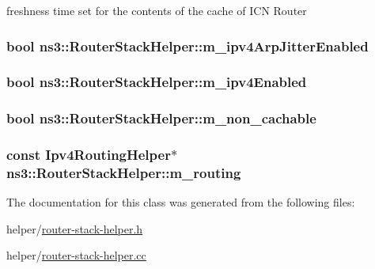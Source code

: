 freshness time set for the contents of the cache of I\-C\-N Router 

\hypertarget{classns3_1_1RouterStackHelper_afb7a40b6e245447f3d9fd6e55afb9a6f}{
\subsubsection[{m\-\_\-ipv4\-Arp\-Jitter\-Enabled}]{\setlength{\rightskip}{0pt plus 5cm}bool ns3\-::\-Router\-Stack\-Helper\-::m\-\_\-ipv4\-Arp\-Jitter\-Enabled\hspace{0.3cm}{\ttfamily [private]}}}\label{classns3_1_1RouterStackHelper_afb7a40b6e245447f3d9fd6e55afb9a6f}
\hypertarget{classns3_1_1RouterStackHelper_a53fa9e728900f9fad07e49487b1b5131}{
\subsubsection[{m\-\_\-ipv4\-Enabled}]{\setlength{\rightskip}{0pt plus 5cm}bool ns3\-::\-Router\-Stack\-Helper\-::m\-\_\-ipv4\-Enabled\hspace{0.3cm}{\ttfamily [private]}}}\label{classns3_1_1RouterStackHelper_a53fa9e728900f9fad07e49487b1b5131}
\hypertarget{classns3_1_1RouterStackHelper_a0c094073c949fe9d5bbe3ec66b2311e6}{
\subsubsection[{m\-\_\-non\-\_\-cachable}]{\setlength{\rightskip}{0pt plus 5cm}bool ns3\-::\-Router\-Stack\-Helper\-::m\-\_\-non\-\_\-cachable\hspace{0.3cm}{\ttfamily [private]}}}\label{classns3_1_1RouterStackHelper_a0c094073c949fe9d5bbe3ec66b2311e6}
\hypertarget{classns3_1_1RouterStackHelper_afce5b67df8aff1a4a8fca50a32d0d746}{
\subsubsection[{m\-\_\-routing}]{\setlength{\rightskip}{0pt plus 5cm}const Ipv4\-Routing\-Helper$\ast$ ns3\-::\-Router\-Stack\-Helper\-::m\-\_\-routing\hspace{0.3cm}{\ttfamily [private]}}}\label{classns3_1_1RouterStackHelper_afce5b67df8aff1a4a8fca50a32d0d746}


The documentation for this class was generated from the following files\-:\begin{DoxyCompactItemize}
\item 
helper/\hyperlink{router-stack-helper_8h}{router-\/stack-\/helper.\-h}\item 
helper/\hyperlink{router-stack-helper_8cc}{router-\/stack-\/helper.\-cc}\end{DoxyCompactItemize}
